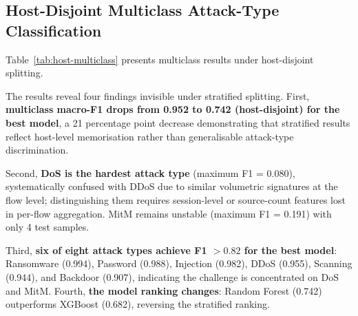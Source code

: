 \documentclass[12pt,a4paper]{report}
\begin{document}
\subsection{Host-Disjoint Multiclass Attack-Type Classification}
\label{sec:host-multiclass}

Table~\ref{tab:host-multiclass} presents multiclass results under host-disjoint splitting.

\begin{table}[H]
\centering
\caption{Host-disjoint multiclass attack-type classification (behaviour-only, 20,000-row balanced test subsample).}
\label{tab:host-multiclass}
\end{table}

The results reveal four findings invisible under stratified splitting. First, \textbf{multiclass macro-F1 drops from 0.952 to 0.742 (host-disjoint) for the best model}, a 21 percentage point decrease demonstrating that stratified results reflect host-level memorisation rather than generalisable attack-type discrimination.

Second, \textbf{DoS is the hardest attack type} (maximum F1 = 0.080), systematically confused with DDoS due to similar volumetric signatures at the flow level; distinguishing them requires session-level or source-count features lost in per-flow aggregation. MitM remains unstable (maximum F1 = 0.191) with only 4 test samples.

Third, \textbf{six of eight attack types achieve F1 $> 0.82$ for the best model}: Ransomware (0.994), Password (0.988), Injection (0.982), DDoS (0.955), Scanning (0.944), and Backdoor (0.907), indicating the challenge is concentrated on DoS and MitM. Fourth, \textbf{the model ranking changes}: Random Forest (0.742) outperforms XGBoost (0.682), reversing the stratified ranking.
\end{document}
